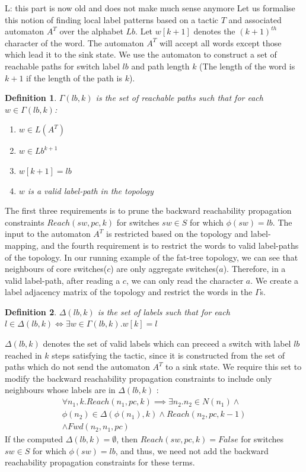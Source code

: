 \documentclass[]{sig}
\newtheorem{mydef}{Definition}
\newcommand{\loris}[1]{\textcolor[rgb]{0.00,0.00,1.00}{L: #1}}
\begin{document}
\loris{this part is now old and does not make much sense anymore
}
Let us formalise this notion of finding local label patterns based on a tactic $T$ and associated automaton $A^T$ over the alphabet $Lb$. Let $w[k+1]$ denotes the $(k + 1)^{th}$ character of the word. The automaton $A^T$ will accept all words except those which lead it to the sink state. We use the automaton to construct a set of reachable paths for switch label $lb$ and path length $k$ (The length of the word is $k + 1$ if the length of the path is $k$). 
\begin{mydef}
	$\Gamma(lb, k)$ is the set of reachable paths such that for each $w \in \Gamma(lb, k)$: 
	\begin{enumerate}
		\item $w \in L(A^T)$
		\item $w \in Lb^{k+1}$
		\item $w[k+1] = lb$
		\item $w$ is a valid label-path in the topology
	\end{enumerate}
\end{mydef}
The first three requirements is to prune the backward reachability propagation constraints \newline $Reach(sw, pc, k)$ for switches $sw \in S$ for which $\phi(sw) = lb$. The input to the automaton $A^T$ is restricted based on the topology and label-mapping, and the fourth requirement is to restrict the words to valid label-paths of the topology. In our running example of the fat-tree topology, we can see that neighbours of core switches($c$) are only aggregate switches($a$). Therefore, in a valid label-path, after reading a $c$, we can only read the character $a$. We create a label adjacency matrix of the topology and restrict the words in the $\Gamma$s. 
\begin{mydef} 
	$\Delta(lb, k)$ is the set of labels such that for each $l \in \Delta(lb, k) \iff \exists w \in \Gamma(lb, k).  w[k] = l$ 
\end{mydef}

$\Delta(lb, k)$ denotes the set of valid labels which can preceed a switch with label $lb$ reached in $k$ steps satisfying the tactic, since it is constructed from the set of paths which do not send the automaton $A^T$ to a sink state. We require this set to modify the backward reachability propagation constraints to include only neighbours whose labels are in $\Delta(lb, k)$ :  
\begin{multline}
\forall n_1,k.  Reach(n_1,pc,k) \implies \exists n_2.  n_2 \in N(n_1) \wedge \\ \phi(n_2) \in 
\Delta(\phi(n_1), k) \wedge Reach(n_2,pc,k-1) \\ \wedge Fwd(n_2,n_1,pc)
\end{multline} 
If the computed $\Delta(lb, k) = \emptyset$, then $Reach(sw, pc, k) = False$ for switches $sw \in S$ for which $\phi(sw) = lb$, and thus, we need not add the backward reachability propagation constraints for these terms. 
\end{document}
